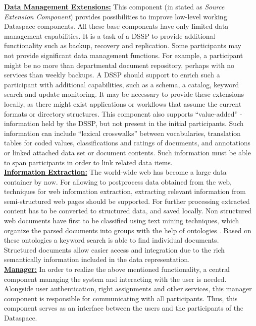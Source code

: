 \uline{\textbf{Data Management Extensions:}} This component (in \cite{Halevy:2006:PDS:1142351.1142352} stated as \textit{Source Extension Component}) provides possibilities to improve low-level working Dataspace components. All these base components have only limited data management capabilities. It is a task of a DSSP to provide additional functionality such as backup, recovery and replication. Some participants may not provide significant data management functions. For example, a participant might be no more than departmental document repository, perhaps with no services than weekly backups. A DSSP should support to enrich such a participant with additional capabilities, such as a schema, a catalog, keyword search and update monitoring. It may be necessary to provide these extensions locally, as there might exist applications or workflows that assume the current formats or directory structures.	
This component also supports ``value-added'' - information held by the DSSP, but not present in the initial participants. Such information can include ``lexical crosswalks'' between vocabularies, translation tables for coded values, classifications and ratings of documents, and annotations or linked attached data set or document contents. Such information must be able to span participants in order to link related data items.\\

\uline{\textbf{Information Extraction:}} The world-wide web has become a large data container by now. For allowing to postprocess data obtained from the web, techniques for web information extraction, extracting relevant information from semi-structured web pages should be supported. For further processing extracted content has to be converted to structured data, and saved locally. Non structured web documents have first to be classified using text mining techniques, which organize the parsed documents into groups with the help of ontologies \cite{conf/wise/HeQZW04}. Based on these ontologies a keyword search is able to find individual documents. Structured documents allow easier access and integration due to the rich semantically information included in the data representation.\\

\uline{\textbf{Manager:}} In order to realize the above mentioned functionality, a central component managing the system and interacting with the user is needed. Alongside user authentication, right assignments and other services, this manager component is responsible for communicating with all participants. Thus, this component serves as an interface between the users and the participants of the Dataspace.\\

